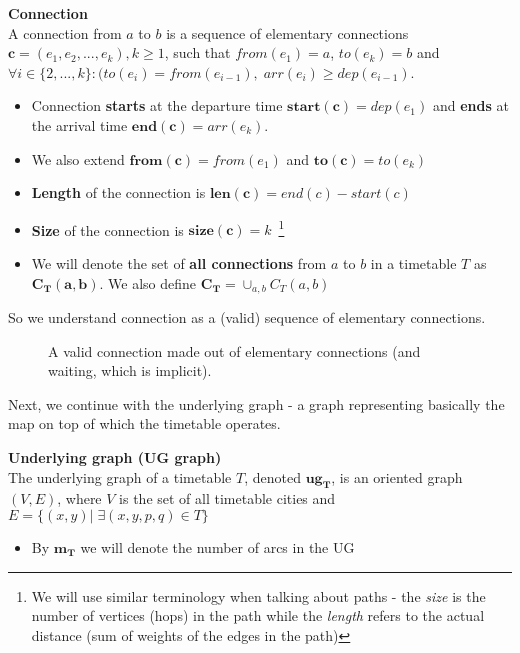    	\begin{definition}
        \textbf{Connection} \\
        A connection from $a$ to $b$ is a sequence of elementary connections $\bm{c} = (e_{1}, e_{2}, ..., e_{k}), k \geq 1$, such that $from(e_{1}) = a$, $to(e_{k}) = b$ and $\forall i \in \{2, ..., k\}: (to(e_{i}) = from(e_{i - 1}), \; arr(e_{i}) \geq dep(e_{i - 1})$.
        \begin{itemize}
			\item Connection \textbf{starts} at the departure time $\bm{start(c)} = dep(e_{1})$ and \textbf{ends} at the arrival time $\bm{end(c)} = arr(e_{k})$.
			\item We also extend $\bm{from(c)} = from(e_{1})$ and $\bm{to(c)} = to(e_{k})$
	        \item \textbf{Length} of the connection is $\bm{len(c)} = end(c) - start(c)$
	        \item \textbf{Size} of the connection is $\bm{size(c)} = k$~\footnote{We will use similar terminology when talking about paths - the \textit{size} is the number of vertices (hops) in the path while the \textit{length} refers to the actual distance (sum of weights of the edges in the path)}
	        \item We will denote the set of \textbf{all connections} from $a$ to $b$ in a timetable $T$ as $\bm{C_{T}(a, b)}$. We also define $\bm{C_{T}} = \cup_{a, b} C_{T}(a, b)$
        \end{itemize}
    \end{definition}
    
    \noindent So we understand connection as a (valid) sequence of elementary connections. 
    
    \begin{figure}[h!]
        \begin{center}
        \end{center}
		\caption{\label{pic:conn} A valid connection made out of \textcolor{elcon-clr}{elementary connections} (and \textcolor{waiting-clr}{waiting}, which is implicit).}
	\end{figure}
	
	\noindent Next, we continue with the underlying graph - a graph representing basically the map on top of which the timetable operates.
	
	\begin{definition}
        \textbf{Underlying graph (UG graph)} \\
        The underlying graph of a timetable $T$, denoted $\bm{ug_{T}}$, is an oriented graph $(V, E)$, where $V$ is the set of all timetable cities and $E = \{(x, y)|\; \exists (x, y, p, q) \in T\}$
        \begin{itemize}
        	\item By $\bm{m_{T}}$ we will denote the number of arcs in the UG
        \end{itemize}
    \end{definition}
    
